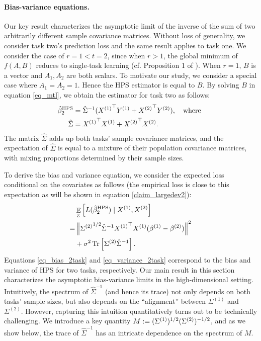 \paragraph{Bias-variance equations.}
Our key result characterizes the asymptotic limit of the inverse of the sum of two arbitrarily different sample covariance matrices.
Without loss of generality, we consider task two's prediction loss and the same result applies to task one.
We consider the case of $r = 1 < t = 2$, since when $r > 1$, the global minimum of $f(A, B)$ reduces to single-task learning (cf. Proposition 1 of \citet{WZR20}).
When $r = 1$, $B$ is a vector and $A_1, A_2$ are both scalars.
To motivate our study, we consider a special case where $A_1=A_2=1$.
Hence the HPS estimator is equal to $B$.
By solving $B$ in equation \eqref{eq_mtl}, we obtain the estimator for task two as follows:
\begin{align}
	\hat{\beta}_2^{\textup{HPS}} &= {\hat{\Sigma}}^{-1} ({X^{(1)}}^{\top} Y^{(1)} + {X^{(2)}}^{\top} Y^{(2)}), \ \ \text{ where } \nonumber \\
	\hat{\Sigma} &= {X^{(1)}}^{\top} X^{(1)} + {X^{(2)}}^{\top} X^{(2)}. \label{def hatsig}
\end{align}
The matrix $\hat{\Sigma}$ adds up both tasks' sample covariance matrices, and the expectation of $\hat{\Sigma}$ is equal to a mixture of their population covariance matrices, with mixing proportions determined by their sample sizes.

 To derive the bias and variance equation, we consider the expected loss conditional on the covariates as follows (the empirical loss is close to this expectation as will be shown in equation \eqref{claim_largedev2}):
\begin{align}
	& \mathop{\mathbb{E}}_{\mathcal{E}}\left[ L(\hat{\beta}_2^{\textup{HPS}}) \mid X^{(1)}, X^{(2)} \right]  \nonumber \\
	=& \left\| {\Sigma^{(2)}}^{1/2} \hat{\Sigma}^{-1} {X^{(1)}}^{\top} X^{(1)} (\beta^{(1)} - \beta^{(2)}) \right\|^2 \label{eq_bias_2task} \\
	& + \sigma^2 \operatorname{Tr}\left[\Sigma^{(2)}\hat{\Sigma}^{-1}\right]. \label{eq_variance_2task}
\end{align}
Equations \eqref{eq_bias_2task} and \eqref{eq_variance_2task} correspond to the bias and variance of HPS for two tasks, respectively.
Our main result in this section characterizes the asymptotic bias-variance limits in the high-dimensional setting.
Intuitively, the spectrum of $\hat{\Sigma}^{-1}$ (and hence its trace) not only depends on both tasks' sample sizes, but also depends on the ``alignment'' between $\Sigma^{(1)}$ and $\Sigma^{(2)}$.
However, capturing this intuition quantitatively turns out to be technically challenging.
We introduce a key quantity $M := (\Sigma^{(1)})^{1/2}(\Sigma^{(2)})^{-1/2}$, and as we show below, the trace of $\hat{\Sigma}^{-1}$ has an intricate dependence on the spectrum of $M$.

